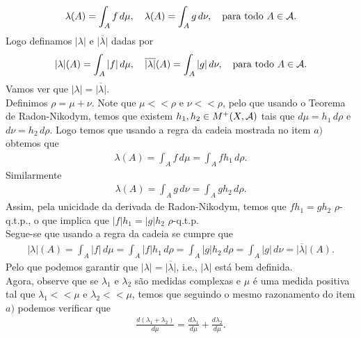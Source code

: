 \begin{homeworkProblem}[3]
\begin{solution}
\begin{enumerate}[a)]
\begin{align*}
        \lambda(A)=\int_{A}f\,d\mu,\quad\lambda(A)=\int_{A}g\,d\nu,\quad\text{para todo }A\in\mathcal{A}.\\
      \end{align*}
      Logo definamos $|\lambda|$ e $\overline{|\lambda|}$ dadas por 
       \begin{align*}
        |\lambda|(A)=\int_{A}|f|\,d\mu,\quad\overline{|\lambda|}(A)=\int_{A}|g|\,d\nu,\quad\text{para todo }A\in\mathcal{A}.\\
      \end{align*}
      Vamos ver que $|\lambda|=\overline{|\lambda|}$.\\
      Definimos $\rho=\mu+\nu$. Note que $\mu<<\rho$ e $\nu<<\rho$, pelo que usando o Teorema de Radon-Nikodym, temos que existem $h_1,h_2\in M^{+}(X,\mathcal{A})$ tais que $d\mu=h_1\,d\rho$ e $d\nu=h_2\,d\rho$. Logo temos que usando a regra da cadeia mostrada no item $a)$ obtemos que 
      \begin{align*}
        \lambda(A)=\int_{A}f\,d\mu=\int_{A}fh_1\,d\rho.
      \end{align*}
      Similarmente
      \begin{align*}
        \lambda(A)=\int_{A}g\,d\nu=\int_{A}gh_2\,d\rho.
      \end{align*}
      Assim, pela unicidade da derivada de Radon-Nikodym, temos que $fh_1=gh_2$ $\rho$-q.t.p., o que implica que $|f|h_1=|g|h_2$ $\rho$-q.t.p.\\
      Segue-se que usando a regra da cadeia se cumpre que
      \begin{align*}
        |\lambda|(A)=\int_{A}|f|\,d\mu=\int_{A}|f|h_1\,d\rho=\int_{A}|g|h_2\,d\rho=\int_{A}|g|\,d\nu=\overline{|\lambda|}(A).        
      \end{align*}
      Pelo que podemos garantir que $|\lambda|=\overline{|\lambda|}$, i.e., $|\lambda|$ está bem definida.\\
      Agora, observe que se $\lambda_1$ e $\lambda_2$ são medidas complexas e $\mu$ é uma medida positiva tal que $\lambda_1<<\mu$ e $\lambda_2<<\mu$, temos que seguindo o mesmo razonamento do item $a)$ podemos verificar que
      \begin{align*}
        \frac{d(\lambda_1+\lambda_2)}{d\mu}=\frac{d\lambda_1}{d\mu}+\frac{d\lambda_2}{d\mu}.
      \end{align*}
\end{enumerate} 
  \end{solution}
\end{homeworkProblem}
